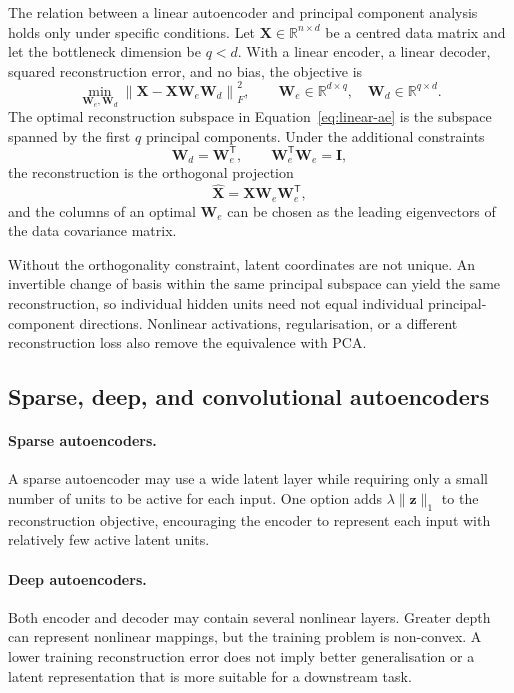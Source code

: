 The relation between a linear autoencoder and principal component analysis holds only under specific conditions. Let \(\mathbf{X}\in\mathbb{R}^{n\times d}\) be a centred data matrix and let the bottleneck dimension be \(q<d\). With a linear encoder, a linear decoder, squared reconstruction error, and no bias, the objective is
\begin{equation}
    \min_{\mathbf{W}_e,\mathbf{W}_d}
    \left\lVert
      \mathbf{X}
      -\mathbf{X}\mathbf{W}_e\mathbf{W}_d
    \right\rVert_F^2,
    \qquad
    \mathbf{W}_e\in\mathbb{R}^{d\times q},
    \quad
    \mathbf{W}_d\in\mathbb{R}^{q\times d}.
    \label{eq:linear-ae}
\end{equation}
The optimal reconstruction subspace in Equation~\eqref{eq:linear-ae} is the subspace spanned by the first \(q\) principal components. Under the additional constraints
\[
    \mathbf{W}_d=\mathbf{W}_e^{\mathsf T},
    \qquad
    \mathbf{W}_e^{\mathsf T}\mathbf{W}_e=\mathbf{I},
\]
the reconstruction is the orthogonal projection
\[
    \widehat{\mathbf{X}}
    =\mathbf{X}\mathbf{W}_e\mathbf{W}_e^{\mathsf T},
\]
and the columns of an optimal \(\mathbf{W}_e\) can be chosen as the leading eigenvectors of the data covariance matrix.

Without the orthogonality constraint, latent coordinates are not unique. An invertible change of basis within the same principal subspace can yield the same reconstruction, so individual hidden units need not equal individual principal-component directions. Nonlinear activations, regularisation, or a different reconstruction loss also remove the equivalence with PCA.

\subsection{Sparse, deep, and convolutional autoencoders}

\paragraph{Sparse autoencoders.}
A sparse autoencoder may use a wide latent layer while requiring only a small
number of units to be active for each input. One option adds
$\lambda\lVert\mathbf z\rVert_1$ to the reconstruction objective, encouraging
the encoder to represent each input with relatively few active latent units.

\paragraph{Deep autoencoders.}
Both encoder and decoder may contain several nonlinear layers. Greater depth can represent nonlinear mappings, but the training problem is non-convex. A lower training reconstruction error does not imply better generalisation or a latent representation that is more suitable for a downstream task.

